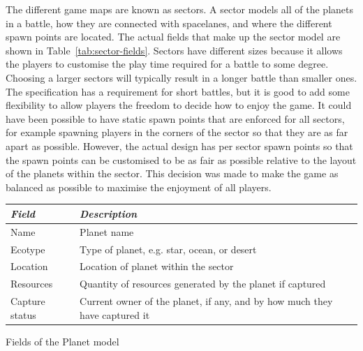 The different game maps are known as sectors. A sector models all of the planets in a battle, how they are connected with spacelanes, and where the different spawn points are located. The actual fields that make up the sector model are shown in Table~\ref{tab:sector-fields}. Sectors have different sizes because it allows the players to customise the play time required for a battle to some degree. Choosing a larger sectors will typically result in a longer battle than smaller ones. The specification has a requirement for short battles, but it is good to add some flexibility to allow players the freedom to decide how to enjoy the game. It could have been possible to have static spawn points that are enforced for all sectors, for example spawning players in the corners of the sector so that they are as far apart as possible. However, the actual design has per sector spawn points so that the spawn points can be customised to be as fair as possible relative to the layout of the planets within the sector. This decision was made to make the game as balanced as possible to maximise the enjoyment of all players.



\begin{margintable}
    \begin{tabular}{p{4em} p{11em}}
    \toprule
    \emph{Field} & \emph{Description} \\
    \midrule
    Name & Planet name \\
    Ecotype & Type of planet, e.g. star, ocean, or desert \\
    Location & Location of planet within the sector \\
    Resources & Quantity of resources generated by the planet if captured \\
    Capture status & Current owner of the planet, if any, and by how much they have captured it \\
    \bottomrule
    \end{tabular}
    \vspace{1em}
    \caption{Fields of the Planet model}
    \label{tab:planet-fields}
\end{margintable}

